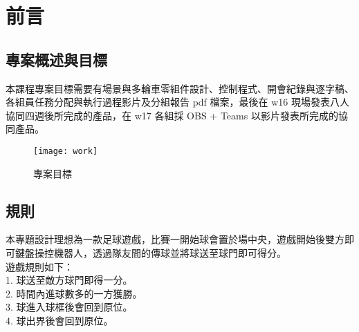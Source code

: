 \chapter{前言}
\renewcommand{\baselinestretch}{10.0} %
\setcounter{page}{1}  %
\fontsize{14pt}{2.5pt}\sectionef
\section{專案概述與目標}
本課程專案目標需要有場景與多輪車零組件設計、控制程式、開會紀錄與逐字稿、各組員任務分配與執行過程影片及分組報告 pdf 檔案，最後在 w16 現場發表八人協同四週後所完成的產品，在 w17 各組採 OBS + Teams 以影片發表所完成的協同產品。
\begin{figure}[hbt!]
\begin{center}
\texttt{[image: work]}
\caption{\Large 專案目標}\label{專案目標}
\end{center}
\end{figure} 

\section{規則}
本專題設計理想為一款足球遊戲，比賽一開始球會置於場中央，遊戲開始後雙方即
可鍵盤操控機器人，透過隊友間的傳球並將球送至球門即可得分。\\
遊戲規則如下：\\
1. 球送至敵方球門即得一分。\\
2. 時間內進球數多的一方獲勝。\\
3. 球進入球框後會回到原位。\\
4. 球出界後會回到原位。\\
\renewcommand{\baselinestretch}{0.5} %